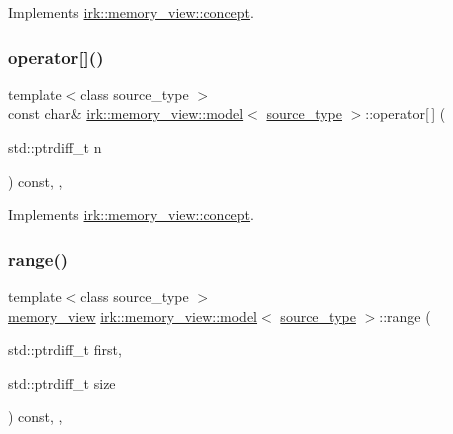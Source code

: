 Implements \mbox{\hyperlink{structirk_1_1memory__view_1_1concept_a9e124ac4016556f7cf7fd864dcc43a7c}{irk\+::memory\+\_\+view\+::concept}}.

\mbox{\label{classirk_1_1memory__view_1_1model_a8c54be09ffb8bd159e375d14a6f8218b}} 
\subsubsection{\texorpdfstring{operator[]()}{operator[]()}}
{\footnotesize\ttfamily template$<$class source\+\_\+type $>$ \\
const char\& \mbox{\hyperlink{classirk_1_1memory__view_1_1model}{irk\+::memory\+\_\+view\+::model}}$<$ \mbox{\hyperlink{irk-score_8cpp_a73f57f67fb1e33bdbfd80bfba2fc9ffe}{source\+\_\+type}} $>$\+::operator\mbox{[}$\,$\mbox{]} (\begin{DoxyParamCaption}\item[{std\+::ptrdiff\+\_\+t}]{n }\end{DoxyParamCaption}) const\hspace{0.3cm}{\ttfamily [inline]}, {\ttfamily [override]}, {\ttfamily [virtual]}}



Implements \mbox{\hyperlink{structirk_1_1memory__view_1_1concept_af36b274207af910870d186a747b9f9f1}{irk\+::memory\+\_\+view\+::concept}}.

\mbox{\label{classirk_1_1memory__view_1_1model_aed67f637a1f0e7e31dcf039074861724}} 
\subsubsection{\texorpdfstring{range()}{range()}}
{\footnotesize\ttfamily template$<$class source\+\_\+type $>$ \\
\mbox{\hyperlink{classirk_1_1memory__view}{memory\+\_\+view}} \mbox{\hyperlink{classirk_1_1memory__view_1_1model}{irk\+::memory\+\_\+view\+::model}}$<$ \mbox{\hyperlink{irk-score_8cpp_a73f57f67fb1e33bdbfd80bfba2fc9ffe}{source\+\_\+type}} $>$\+::range (\begin{DoxyParamCaption}\item[{std\+::ptrdiff\+\_\+t}]{first,  }\item[{std\+::ptrdiff\+\_\+t}]{size }\end{DoxyParamCaption}) const\hspace{0.3cm}{\ttfamily [inline]}, {\ttfamily [override]}, {\ttfamily [virtual]}}



